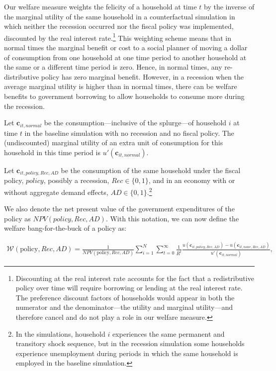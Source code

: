 \documentclass[\econtexRoot/HAFiscal]{subfiles}
\begin{document}
Our welfare measure weights the felicity of a household at time $t$ by the inverse of the marginal utility of the same household in a counterfactual simulation in which neither the recession occurred nor the fiscal policy was implemented, discounted by the real interest rate.\footnote{Discounting at the real interest rate accounts for the fact that a redistributive policy over time will require borrowing or lending at the real interest rate. The preference discount factors of households would appear in both the numerator and the denominator---the utility and marginal utility---and therefore cancel and do not play a role in our welfare measure.} This weighting scheme means that in normal times the marginal benefit or cost to a social planner of moving a dollar of consumption from one household at one time period to another household at the same or a different time period is zero. Hence, in normal times, any re-distributive policy has zero marginal benefit. However, in a recession when the average marginal utility is higher than in normal times, there can be welfare benefits to government borrowing to allow households to consume more during the recession.

Let $\mathbf{c}_{it,\textit{normal}}$ be the consumption---inclusive of the splurge---of household $i$ at time $t$ in the baseline simulation with no recession and no fiscal policy. The (undiscounted) marginal utility of an extra unit of consumption for this household in this time period is $ u'(\mathbf{c}_{it,\textit{normal}})$.  

Let $\mathbf{c}_{it,\textit{policy},Rec,AD}$ be the consumption of the same household under the fiscal policy, $\textit{policy}$, possibly a recession, $Rec \in \{0,1\}$, and in an economy with or without aggregate demand effects, $AD \in \{0,1\}$.\footnote{In the simulations, household $i$ experiences the same permanent and transitory shock sequence, but in the recession simulation some households experience unemployment during periods in which the same household is employed in the baseline simulation.}

We also denote the net present value of the government expenditures of the policy as $NPV(\textit{policy},Rec,AD)$. With this notation, we can now define the welfare bang-for-the-buck of a policy as:

\begin{align} \label{welfare_def6}
	\mathcal{W}(\text{policy},Rec,AD) =\frac{1}{NPV(\text{policy},Rec,AD)}\sum_{i=1}^{N} \sum_{t=0}^{\infty} \frac{1}{R^t} \frac{u(\mathbf{c}_{it,\textit{policy},Rec,AD}) - u(\mathbf{c}_{it,\textit{none},Rec,AD})}{ u'(\mathbf{c}_{it,\textit{normal}})} ,
\end{align}
\end{document}
